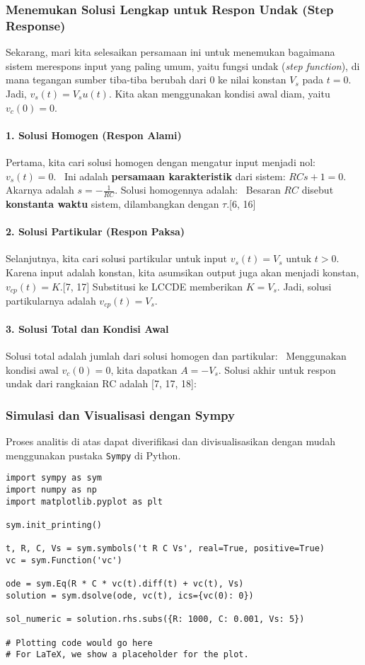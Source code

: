 \documentclass[12pt, a4paper]{article}
\begin{document}
\subsubsection{Menemukan Solusi Lengkap untuk Respon Undak (Step Response)}
Sekarang, mari kita selesaikan persamaan ini untuk menemukan bagaimana sistem merespons input yang paling umum, yaitu fungsi undak (\textit{step function}), di mana tegangan sumber tiba-tiba berubah dari 0 ke nilai konstan $V_s$ pada $t=0$. Jadi, $v_s(t) = V_s u(t)$. Kita akan menggunakan kondisi awal diam, yaitu $v_c(0) = 0$.

\paragraph{1. Solusi Homogen (Respon Alami)}
Pertama, kita cari solusi homogen dengan mengatur input menjadi nol: $v_s(t) = 0$.
\
Ini adalah \textbf{persamaan karakteristik} dari sistem: $RCs + 1 = 0$. Akarnya adalah $s = -\frac{1}{RC}$. Solusi homogennya adalah:
\
Besaran $RC$ disebut \textbf{konstanta waktu} sistem, dilambangkan dengan $\tau$.[6, 16]

\paragraph{2. Solusi Partikular (Respon Paksa)}
Selanjutnya, kita cari solusi partikular untuk input $v_s(t) = V_s$ untuk $t > 0$. Karena input adalah konstan, kita asumsikan output juga akan menjadi konstan, $v_{cp}(t) = K$.[7, 17] Substitusi ke LCCDE memberikan $K = V_s$. Jadi, solusi partikularnya adalah $v_{cp}(t) = V_s$.

\paragraph{3. Solusi Total dan Kondisi Awal}
Solusi total adalah jumlah dari solusi homogen dan partikular:
\
Menggunakan kondisi awal $v_c(0) = 0$, kita dapatkan $A = -V_s$. Solusi akhir untuk respon undak dari rangkaian RC adalah [7, 17, 18]:
\

\subsubsection{Simulasi dan Visualisasi dengan Sympy}
Proses analitis di atas dapat diverifikasi dan divisualisasikan dengan mudah menggunakan pustaka \texttt{Sympy} di Python.
\begin{lstlisting}
import sympy as sym
import numpy as np
import matplotlib.pyplot as plt

sym.init_printing()

t, R, C, Vs = sym.symbols('t R C Vs', real=True, positive=True)
vc = sym.Function('vc')

ode = sym.Eq(R * C * vc(t).diff(t) + vc(t), Vs)
solution = sym.dsolve(ode, vc(t), ics={vc(0): 0})

sol_numeric = solution.rhs.subs({R: 1000, C: 0.001, Vs: 5})

# Plotting code would go here
# For LaTeX, we show a placeholder for the plot.
\end{lstlisting}
\end{document}
